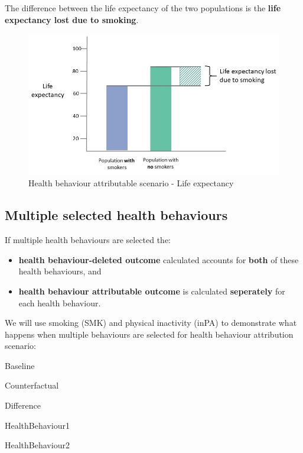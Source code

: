 \documentclass[]{book}
\providecommand{\tightlist}{%
  \setlength{\itemsep}{0pt}\setlength{\parskip}{0pt}}
\begin{document}
The difference between the life expectancy of the two populations is the
\textbf{life expectancy lost due to smoking}.

\begin{figure}

{\centering \includegraphics{Images/HB attributable LE} 

}

\caption{Health behaviour attributable scenario - Life expectancy}\label{fig:unnamed-chunk-50}
\end{figure}

\subsection{Multiple selected health
behaviours}\label{multiple-selected-health-behaviours}

If multiple health behaviours are selected the:

\begin{itemize}
\tightlist
\item
  \textbf{health behaviour-deleted outcome} calculated accounts for
  \textbf{both} of these health behaviours, and
\item
  \textbf{health behaviour attributable outcome} is calculated
  \textbf{seperately} for each health behaviour.
\end{itemize}

We will use smoking (SMK) and physical inactivity (inPA) to demonstrate
what happens when multiple behaviours are selected for health behaviour
attribution scenario:

Baseline

Counterfactual

Difference

HealthBehaviour1

HealthBehaviour2
\end{document}
